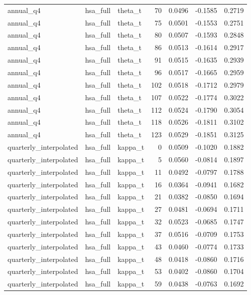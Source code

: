 \begin{tabular}{lllrrrr}
annual\_q4 & hsa\_full & theta\_t & 70 & 0.0496 & -0.1585 & 0.2719 \\
annual\_q4 & hsa\_full & theta\_t & 75 & 0.0501 & -0.1553 & 0.2751 \\
annual\_q4 & hsa\_full & theta\_t & 80 & 0.0507 & -0.1593 & 0.2848 \\
annual\_q4 & hsa\_full & theta\_t & 86 & 0.0513 & -0.1614 & 0.2917 \\
annual\_q4 & hsa\_full & theta\_t & 91 & 0.0515 & -0.1635 & 0.2939 \\
annual\_q4 & hsa\_full & theta\_t & 96 & 0.0517 & -0.1665 & 0.2959 \\
annual\_q4 & hsa\_full & theta\_t & 102 & 0.0518 & -0.1712 & 0.2979 \\
annual\_q4 & hsa\_full & theta\_t & 107 & 0.0522 & -0.1774 & 0.3022 \\
annual\_q4 & hsa\_full & theta\_t & 112 & 0.0524 & -0.1790 & 0.3054 \\
annual\_q4 & hsa\_full & theta\_t & 118 & 0.0526 & -0.1811 & 0.3102 \\
annual\_q4 & hsa\_full & theta\_t & 123 & 0.0529 & -0.1851 & 0.3125 \\
quarterly\_interpolated & hsa\_full & kappa\_t & 0 & 0.0509 & -0.1020 & 0.1882 \\
quarterly\_interpolated & hsa\_full & kappa\_t & 5 & 0.0560 & -0.0814 & 0.1897 \\
quarterly\_interpolated & hsa\_full & kappa\_t & 11 & 0.0492 & -0.0797 & 0.1788 \\
quarterly\_interpolated & hsa\_full & kappa\_t & 16 & 0.0364 & -0.0941 & 0.1682 \\
quarterly\_interpolated & hsa\_full & kappa\_t & 21 & 0.0382 & -0.0850 & 0.1694 \\
quarterly\_interpolated & hsa\_full & kappa\_t & 27 & 0.0481 & -0.0694 & 0.1711 \\
quarterly\_interpolated & hsa\_full & kappa\_t & 32 & 0.0523 & -0.0685 & 0.1747 \\
quarterly\_interpolated & hsa\_full & kappa\_t & 37 & 0.0516 & -0.0709 & 0.1753 \\
quarterly\_interpolated & hsa\_full & kappa\_t & 43 & 0.0460 & -0.0774 & 0.1733 \\
quarterly\_interpolated & hsa\_full & kappa\_t & 48 & 0.0418 & -0.0860 & 0.1716 \\
quarterly\_interpolated & hsa\_full & kappa\_t & 53 & 0.0402 & -0.0860 & 0.1704 \\
quarterly\_interpolated & hsa\_full & kappa\_t & 59 & 0.0438 & -0.0763 & 0.1692 \\

\end{tabular}
